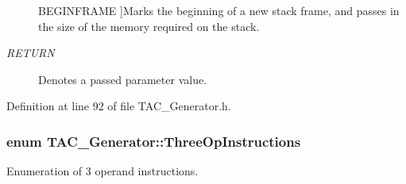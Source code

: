 \begin{Desc}
\begin{description}
{\hypertarget{classTAC__Generator_ab58b7044cb5d16a454f4e01514175123a2900d0c97873b8e4282491148b366771}{B\-E\-G\-I\-N\-F\-R\-A\-M\-E}\label{classTAC__Generator_ab58b7044cb5d16a454f4e01514175123a2900d0c97873b8e4282491148b366771}
}]Marks the beginning of a new stack frame, and passes in the size of the memory required on the stack. \item[{\em 
\hypertarget{classTAC__Generator_ab58b7044cb5d16a454f4e01514175123a0e868fa94bac0750a62dfa98d0f56510}{R\-E\-T\-U\-R\-N}\label{classTAC__Generator_ab58b7044cb5d16a454f4e01514175123a0e868fa94bac0750a62dfa98d0f56510}
}]Denotes a passed parameter value. \end{description}
\end{Desc}


Definition at line 92 of file T\-A\-C\-\_\-\-Generator.\-h.

\hypertarget{classTAC__Generator_ae032b80a215a10604c5273b65e7dab4c}{
\subsubsection[{Three\-Op\-Instructions}]{\setlength{\rightskip}{0pt plus 5cm}enum {\bf T\-A\-C\-\_\-\-Generator\-::\-Three\-Op\-Instructions}}}\label{classTAC__Generator_ae032b80a215a10604c5273b65e7dab4c}


Enumeration of 3 operand instructions. 

